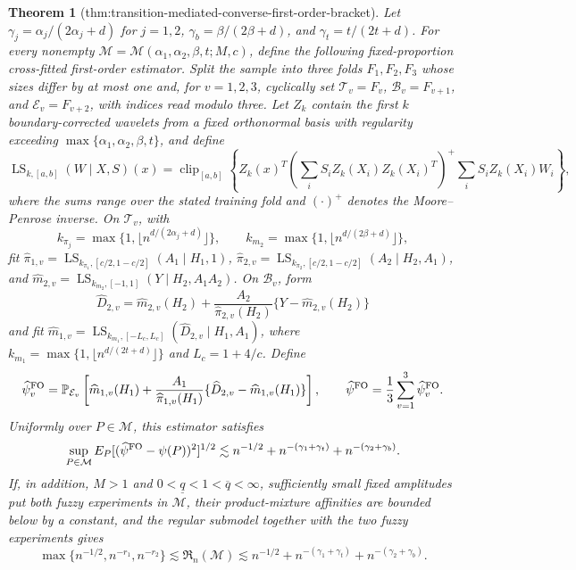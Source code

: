 \documentclass{article}
\newtheorem{theorem}{Theorem}
\begin{document}
\begin{theorem}[thm:transition-mediated-converse-first-order-bracket]\label{thm:transition-mediated-converse-first-order-bracket}
Let \(\gamma_j=\alpha_j/(2\alpha_j+d)\) for \(j=1,2\), \(\gamma_b=\beta/(2\beta+d)\), and \(\gamma_t=t/(2t+d)\). For every nonempty \(\mathcal M=\mathcal M(\alpha_1,\alpha_2,\beta,t;M,c)\), define the following fixed-proportion cross-fitted first-order estimator. Split the sample into three folds \(F_1,F_2,F_3\) whose sizes differ by at most one and, for \(v=1,2,3\), cyclically set \(\mathcal T_v=F_v\), \(\mathcal B_v=F_{v+1}\), and \(\mathcal E_v=F_{v+2}\), with indices read modulo three. Let \(Z_k\) contain the first \(k\) boundary-corrected wavelets from a fixed orthonormal basis with regularity exceeding \(\max\{\alpha_1,\alpha_2,\beta,t\}\), and define
\[\operatorname{LS}_{k,[a,b]}(W\mid X,S)(x)=\operatorname{clip}_{[a,b]}\!\left\{Z_k(x)^T\left(\sum_iS_iZ_k(X_i)Z_k(X_i)^T\right)^+\sum_iS_iZ_k(X_i)W_i\right\},\]
where the sums range over the stated training fold and \((\cdot)^+\) denotes the Moore--Penrose inverse. On \(\mathcal T_v\), with
\[k_{\pi_j}=\max\{1,\lfloor n^{d/(2\alpha_j+d)}\rfloor\},\qquad k_{m_2}=\max\{1,\lfloor n^{d/(2\beta+d)}\rfloor\},\]
fit \(\widehat\pi_{1,v}=\operatorname{LS}_{k_{\pi_1},[c/2,1-c/2]}(A_1\mid H_1,1)\), \(\widehat\pi_{2,v}=\operatorname{LS}_{k_{\pi_2},[c/2,1-c/2]}(A_2\mid H_2,A_1)\), and \(\widehat m_{2,v}=\operatorname{LS}_{k_{m_2},[-1,1]}(Y\mid H_2,A_1A_2)\). On \(\mathcal B_v\), form
\[\widehat D_{2,v}=\widehat m_{2,v}(H_2)+\frac{A_2}{\widehat\pi_{2,v}(H_2)}\{Y-\widehat m_{2,v}(H_2)\}\]
and fit \(\widehat m_{1,v}=\operatorname{LS}_{k_{m_1},[-L_c,L_c]}(\widehat D_{2,v}\mid H_1,A_1)\), where \(k_{m_1}=\max\{1,\lfloor n^{d/(2t+d)}\rfloor\}\) and \(L_c=1+4/c\). Define
\[\widehat\psi_v^{\rm FO}=\mathbb P_{\mathcal E_v}\left[\widehat m_{1,v}(H_1)+\frac{A_1}{\widehat\pi_{1,v}(H_1)}\{\widehat D_{2,v}-\widehat m_{1,v}(H_1)\}\right],\qquad \widehat\psi^{\rm FO}=\frac13\sum_{v=1}^3\widehat\psi_v^{\rm FO}.\]
Uniformly over \(P\in\mathcal M\), this estimator satisfies
\[\sup_{P\in\mathcal M}E_P[(\widehat\psi^{\rm FO}-\psi(P))^2]^{1/2}\lesssim n^{-1/2}+n^{-(\gamma_1+\gamma_t)}+n^{-(\gamma_2+\gamma_b)}.\]
If, in addition, \(M>1\) and \(0<\underline q<1<\overline q<\infty\), sufficiently small fixed amplitudes put both fuzzy experiments in \(\mathcal M\), their product-mixture affinities are bounded below by a constant, and the regular submodel together with the two fuzzy experiments gives
\[\max\{n^{-1/2},n^{-r_1},n^{-r_2}\}\lesssim\mathfrak R_n(\mathcal M)\lesssim n^{-1/2}+n^{-(\gamma_1+\gamma_t)}+n^{-(\gamma_2+\gamma_b)}.\]

\end{theorem}
\end{document}
